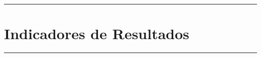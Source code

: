 
  \thispagestyle{empty}


    \begin{minipage}{0.85\textwidth}
    \end{minipage}%

    \vspace{14cm}
    \begin{minipage}{0.85\textwidth}
      \begin{center}
          \sffamily
          
           \rule{\textwidth}{0.2mm}
          { \sffamily \color{modalblue}%
        \chapter{Indicadores de Resultados} 
        }
          \rule{\textwidth}{0.2mm}\\
      \end{center}
    \end{minipage}%
    

